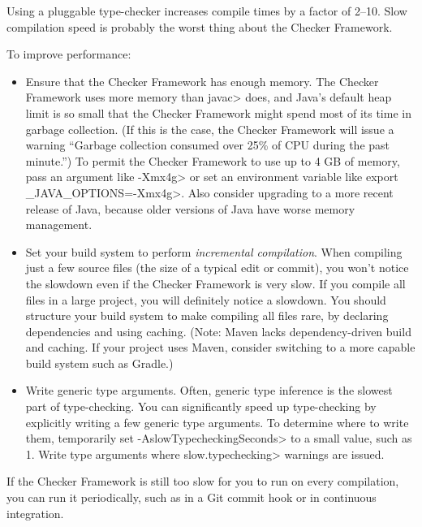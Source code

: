 
Using a pluggable type-checker increases compile times by a factor of 2--10.
Slow compilation speed is probably the worst thing about the Checker
Framework.

To improve performance:
\begin{itemize}
\item
  Ensure that the Checker Framework has enough memory.  The Checker
  Framework uses more memory than \<javac> does, and Java's default heap
  limit is so small that the Checker Framework might spend most of its time
  in garbage collection.  (If this is the case, the Checker Framework will
  issue a warning ``Garbage collection consumed over 25\% of CPU during the
  past minute.'')  To permit the Checker Framework to use up to 4 GB of
  memory, pass an argument like \<-Xmx4g> or set an environment variable
  like \<export \_JAVA\_OPTIONS=-Xmx4g>.  Also consider upgrading to a more
  recent release of Java, because older versions of Java
  have worse memory management.
\item
  Set your build system to perform \emph{incremental compilation}.  When
  compiling just a few source files (the size of a typical edit or commit),
  you won't notice the slowdown even if the Checker Framework is very slow.
  If you compile all files in a large project, you will definitely notice a
  slowdown.  You should structure your build system to make compiling all
  files rare, by declaring dependencies and using caching.
  (Note: Maven lacks dependency-driven build and caching.  If your project
  uses Maven, consider switching to a more capable build system such as Gradle.)
\item
  Write generic type arguments.  Often, generic type inference is the
  slowest part of type-checking.  You can significantly speed up
  type-checking by explicitly writing a few generic type arguments.  To
  determine where to write them, temporarily set
  \<-AslowTypecheckingSeconds> to a small value, such as 1.  Write type
  arguments where \<slow.typechecking> warnings are issued.
\end{itemize}

If the Checker Framework is still too slow for you to run on every compilation,
you can run it periodically, such as in a Git commit hook or in continuous
integration.

